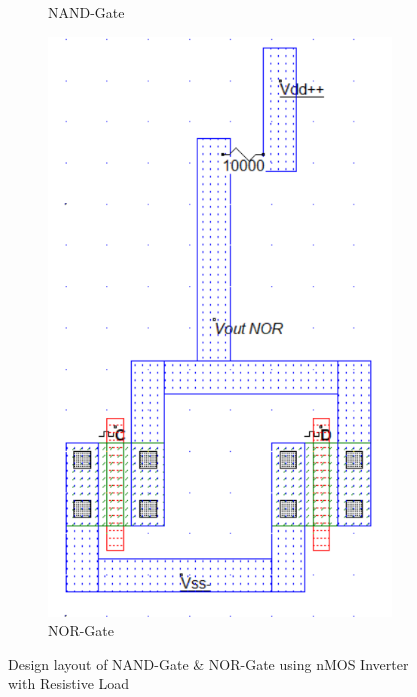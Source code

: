 \documentclass[a4paper,12pt]{article}
\begin{document}
\begin{figure}[H]
\begin{subfigure}[t]{0.49\textwidth}
		\caption{NAND-Gate}
		
		\label{fig:ci1}
	\end{subfigure}
	\hfill
	\begin{subfigure}[t]{0.49\textwidth}
		\centering
		\includegraphics[width=1.2\linewidth]{Images5/4}
		\caption{NOR-Gate}
		\label{fig:ci1}
	\end{subfigure}
	\caption{Design layout of NAND-Gate \& NOR-Gate using nMOS Inverter with Resistive Load}
\end{figure}

	
	
\end{document}
